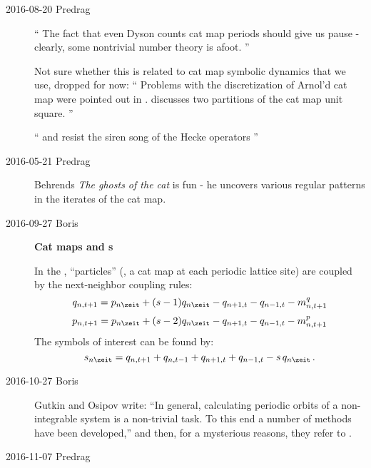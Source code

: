 \begin{description}
\item[2016-08-20 Predrag]
``
The fact that even Dyson counts cat map periods should give
us pause - clearly, some nontrivial number theory is afoot.
''

Not sure whether this is related to cat map symbolic dynamics that we use,
    dropped for now: ``
Problems with the discretization of Arnol'd cat map were pointed out in
.  discusses two partitions of
the cat map unit square.
    ''

``
and resist the
siren song of the Hecke operators
''

\item[2016-05-21 Predrag]
Behrends {\em The ghosts of the cat} is fun - he
uncovers various regular patterns in the iterates of the cat map.

\item[2016-09-27 Boris]
{\bf Cat maps and \catlatt s}

In the {\catlatt}, ``particles'' (\ie, a cat map at each  periodic lattice
site) are coupled by the next-neighbor coupling rules:
\[
q_{n, t+1}=p_{n\zeit}+(s-1)q_{n\zeit} - q_{n+1,t} - q_{n-1,t} - {m}^q_{n,t+1}
\]
\[
p_{n,t+1}= p_{n\zeit} + (s-2) q_{n\zeit} - q_{n+1,t} - q_{n-1,t} - {m}^p_{n,t+1}
\]
The symbols of interest can be found by:
\[
\Ssym{n\zeit} = q_{n,t+1} + q_{n,t-1} + q_{n+1,t} + q_{n-1, t} -  s \, q_{n\zeit}
\,.
\]

\item[2016-10-27 Boris]
Gutkin and Osipov write:
``In general, calculating periodic orbits of a  non-integrable  system  is a
non-trivial  task.   To  this  end  a  number  of  methods have  been
developed,'' and then,  for a mysterious reasons, they refer to
.

\item[2016-11-07 Predrag]


\end{description}
